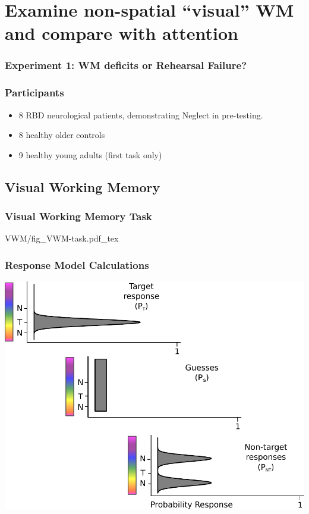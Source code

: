 \documentclass{beamer}
\begin{document}
\section[Attention and WM]{Examine non-spatial ``visual'' WM and compare with attention}

\begin{frame}
	\frametitle{Experiment 1: WM deficits or Rehearsal Failure?}
		\tableofcontents[currentsection]
\end{frame}

\begin{frame}
\frametitle{Participants}
\begin{itemize}
	\item 8 RBD neurological patients, demonstrating Neglect in pre-testing.
	\item 8 healthy older controls
	\item 9 healthy young adults (first task only)
\end{itemize}
\end{frame}

\subsection*{Visual Working Memory}

\begin{frame}
	\frametitle{Visual Working Memory Task}
	\def\svgwidth{\textwidth}
	{VWM/fig_VWM-task.pdf_tex}
\end{frame}

\end{document}
